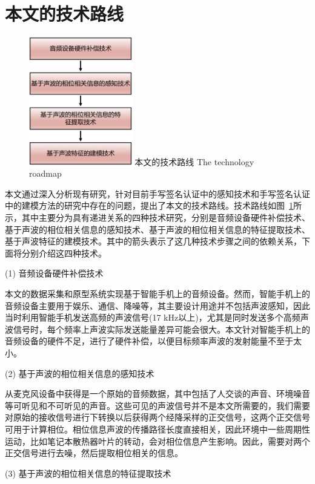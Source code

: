 \section{本文的技术路线}
\begin{figure}[!htp]
  \centering
  \includegraphics[width=0.4\textwidth]{figure/technique-road.pdf}
  \bicaption
    {本文的技术路线}
    {The technology roadmap}
  \label{fig:technology-roadmap}
\end{figure}
本文通过深入分析现有研究，针对目前手写签名认证中的感知技术和手写签名认证中的建模方法的研究中存在的问题，提出了本文的技术路线。技术路线如图~\ref{fig:technology-roadmap}所示，其中主要分为具有递进关系的四种技术研究，分别是音频设备硬件补偿技术、基于声波的相位相关信息的感知技术、基于声波的相位相关信息的特征提取技术、基于声波特征的建模技术。其中的箭头表示了这几种技术步骤之间的依赖关系，下面将分别介绍这四种技术。

(1) 音频设备硬件补偿技术

本文的数据采集和原型系统实现基于智能手机上的音频设备。然而，智能手机上的音频设备主要用于娱乐、通信、降噪等，其主要设计用途并不包括声波感知，因此当时利用智能手机发送高频的声波信号(17 kHz以上)，尤其是同时发送多个高频声波信号时，每个频率上声波实际发送能量差异可能会很大。本文针对智能手机上的音频设备的硬件不足，进行了硬件补偿，以便目标频率声波的发射能量不至于太小。

(2) 基于声波的相位相关信息的感知技术

从麦克风设备中获得是一个原始的音频数据，其中包括了人交谈的声音、环境噪音等可听见和不可听见的声音。这些可见的声波信号并不是本文所需要的，我们需要对原始的接收信号进行下转换以后获得两个经降采样的正交信号，这两个正交信号可用于计算相位。相位信息声波的传播路径长度直接相关，因此环境中一些周期性运动，比如笔记本散热器叶片的转动，会对相位信息产生影响。因此，需要对两个正交信号进行去噪，然后提取相位相关的信息。

(3) 基于声波的相位相关信息的特征提取技术

